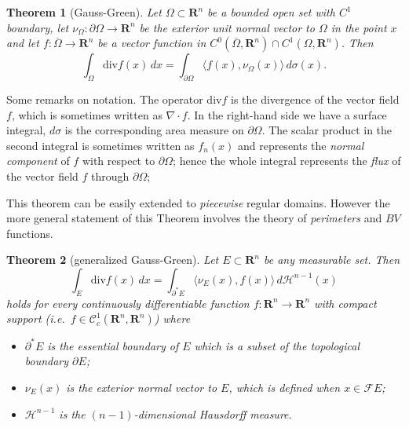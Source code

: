 \documentclass[12pt]{article}
\newcommand{\R}{\mathbf R}
\newtheorem{theorem}{Theorem}
\begin{document}
\begin{theorem}[Gauss-Green]
Let $\Omega\subset \R^n$ be a bounded open set with $C^1$ boundary, let $\nu_\Omega\colon \partial \Omega\to \R^n$ be the exterior unit normal vector to $\Omega$ in the point $x$ and let $f\colon \overline{\Omega}\to \R^n$ be a vector function in $C^0(\overline\Omega,\R^n)\cap C^1(\Omega,\R^n)$. Then
\[
  \int_\Omega \mathrm{div} f(x)\, dx 
   =\int_{\partial \Omega} \langle f(x),\nu_\Omega(x)\rangle \, d\sigma(x).
\]
\end{theorem}

Some remarks on notation.
The operator $\mathrm{div} f$ is the divergence of the vector field $f$, which is sometimes written as $\nabla \cdot f$.
In the right-hand side we have a surface integral, $d\sigma$ is the corresponding area measure on $\partial \Omega$.
The scalar product in the second integral is sometimes written as $f_n(x)$
and represents the \emph{normal component} of $f$ with respect to $\partial \Omega$; hence the whole integral represents the \emph{flux} of the vector field $f$ through $\partial \Omega$;

This theorem can be easily extended to \emph{piecewise} regular domains. 
However the more general statement of this Theorem involves the theory of \emph{perimeters} and $BV$ functions.
\begin{theorem}[generalized Gauss-Green]
Let $E\subset \R^n$ be any measurable set.
Then 
\[
  \int_E \mathrm{div} f(x)\, dx
  = \int_{\partial^* E} \langle \nu_E(x),f(x)\rangle \,d\mathcal H^{n-1}(x)
\]
holds for every continuously differentiable function $f\colon \R^n\to\R^n$ with compact support (i.e.\ $f\in\mathcal C^1_c(\R^n,\R^n)$) where
\begin{itemize}
\item
$\partial^* E$ is the \emph{essential boundary} of $E$ which is a subset of the topological boundary $\partial E$;
\item $\nu_E(x)$ is the exterior normal vector to $E$, which is defined when $x\in\mathcal F E$;
\item $\mathcal H^{n-1}$ is the $(n-1)$-dimensional Hausdorff measure.
\end{itemize}
\end{theorem}
\end{document}
